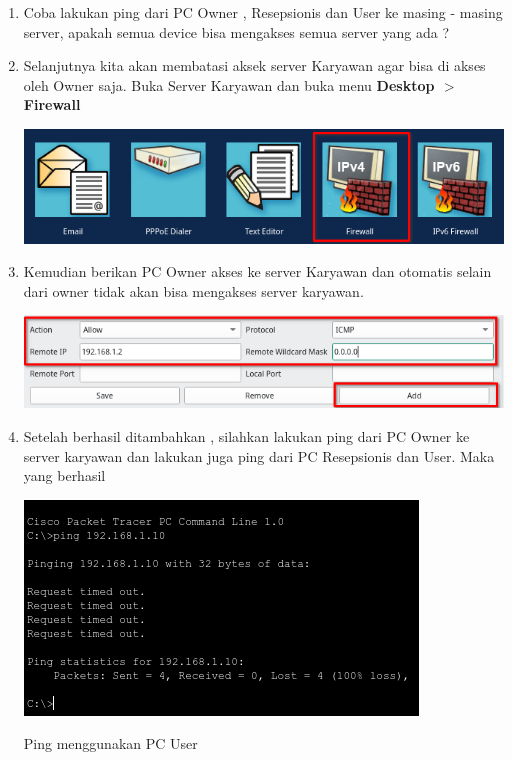 \documentclass{article}
\begin{document}
\begin{flushleft}
\begin{enumerate}
            \item Coba lakukan ping dari PC Owner , Resepsionis dan User ke masing - masing server, apakah semua device bisa mengakses semua server yang ada ?
            
            \item Selanjutnya kita akan membatasi aksek server Karyawan agar bisa di akses oleh Owner saja. Buka Server Karyawan dan buka menu \textbf{Desktop $>$ Firewall}
            
            \includegraphics[scale=0.6]{3-2.png}

            \item Kemudian berikan PC Owner akses ke server Karyawan dan otomatis selain dari owner tidak akan bisa mengakses server karyawan.
            
            \includegraphics[scale=0.6]{3-3.png}

            \item Setelah berhasil ditambahkan , silahkan lakukan ping dari PC Owner ke server karyawan dan lakukan juga ping dari PC Resepsionis dan User. Maka yang berhasil 
            
            \begin{center}
                \includegraphics[]{3-4.png}

                Ping menggunakan PC User
            \end{center}
            

\end{enumerate}
\end{flushleft}
\end{document}
